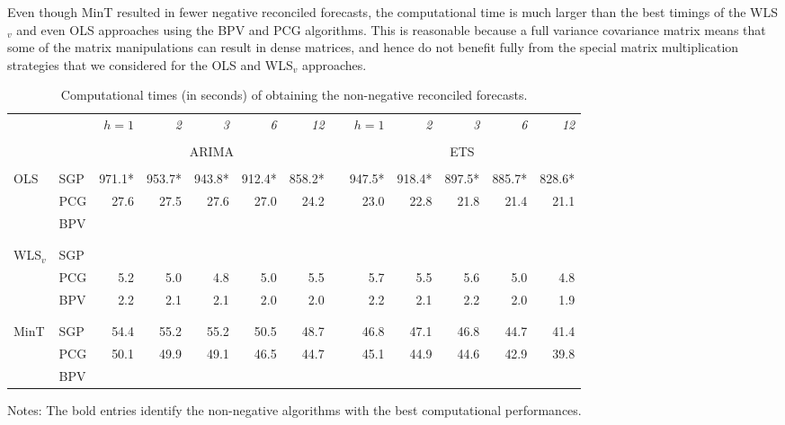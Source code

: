 \documentclass[11pt]{article}
\newcommand{\0}{\phantom{0}}
\begin{document}
Even though MinT resulted in fewer negative reconciled forecasts, the computational time is much larger than the best timings of the WLS$_{v}$ and even OLS approaches using the BPV and PCG algorithms. This is reasonable because a full variance covariance matrix means that some of the matrix manipulations can result in dense matrices, and hence do not benefit fully from the special matrix multiplication strategies that we considered for the OLS and WLS$_{v}$ approaches.

\begin{table}[p]
	\centering
	\fontsize{9}{12}\rm\tabcolsep=0.13cm
	\caption{Computational times (in seconds) of obtaining the non-negative reconciled forecasts.}
	\label{tbl:timingap}
	\begin{threeparttable}
		\begin{tabular}{llrrrrrrrrrrr}
			\toprule
			& & \it{$h=1$} & \it{2} & \it{3} & \it{6} & \it{12} & & \it{$h=1$} & \it{2} & \it{3} & \it{6} & \it{12} \\
			\cline{3-7} \cline{9-13} \\[-0.3cm]
			& & \multicolumn{5}{c}{ARIMA} & & \multicolumn{5}{c}{ETS} \\\cline{3-7} \cline{9-13}\\[-0.3cm]
			OLS & SGP & 971.1* & 953.7* & 943.8* & 912.4* & 858.2* & & 947.5* & 918.4* & 897.5* & 885.7* & 828.6* \\
			& PCG & 27.6 & 27.5 & 27.6 & 27.0 & 24.2 & & 23.0 & 22.8 & 21.8 & 21.4 & 21.1 \\
			& BPV & \bm{$3.0$} & \bm{$2.8$} & \bm{$2.9$} & \bm{$2.8$} & \bm{$2.6$} & & \bm{$2.3$} & \bm{$2.3$} & \bm{$2.2$} & \bm{$2.1$} & \bm{$2.0$} \\ \\[-0.3cm]
			\cline{3-7} \cline{9-13} \\[-0.3cm]
			WLS$_{v}$ & SGP & \bm{$2.0$} & \bm{$1.9$} & \bm{$1.9$} & \bm{$1.9$} & \bm{$1.8$} & & \bm{$2.1$} & \bm{$2.0$} & \bm{$2.0$} & \bm{$1.9$} & \bm{$1.8$} \\
			& PCG & 5.2 & 5.0 & 4.8 & 5.0 & 5.5 & & 5.7 & 5.5 & 5.6 & 5.0 & 4.8 \\
			& BPV & 2.2 & 2.1 & 2.1 & 2.0 & 2.0 & & 2.2 & 2.1 & 2.2 & 2.0 & 1.9 \\ \\[-0.3cm]
			\cline{3-7} \cline{9-13} \\[-0.3cm]
			MinT & SGP & 54.4 & 55.2 & 55.2 & 50.5 & 48.7 & & 46.8 & 47.1 & 46.8 & 44.7 & 41.4 \\
			& PCG & 50.1 & 49.9 & 49.1 & 46.5 & 44.7 & & 45.1 & 44.9 & 44.6 & 42.9 & 39.8 \\
			& BPV & \bm{$38.4$} & \bm{$37.8$} & \bm{$37.5$} & \bm{$36.2$} & \bm{$33.7$} & & \bm{$38.2$} & \bm{$37.7$} & \bm{$37.3$} & \bm{$36.0$} & \bm{$33.6$} \\
			\bottomrule
		\end{tabular}
		\begin{tablenotes}
			\item [] Notes: The bold entries identify the non-negative algorithms with the best computational performances.
		\end{tablenotes}
	\end{threeparttable}
\end{table}
\end{document}
